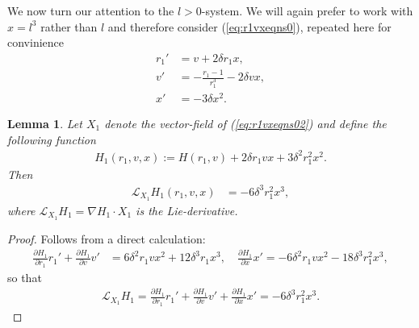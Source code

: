 \documentclass[reqno,12pt]{amsart}
\newcommand{\eqlab}[1]{\label{eq:#1}}
\renewcommand{\eqref}[1]{(\ref{eq:#1})}
\newcommand{\lemmalab}[1]{\label{lemma:#1}}
\newtheorem{lemma}[theorem]{Lemma}
\numberwithin{equation}{section}
\begin{document}
We now turn our attention to the $l>0$-system. We will again prefer to work with $x=l^3$ rather than $l$ and therefore consider \eqref{r1vxeqns0}, repeated here for convinience
\begin{equation}\eqlab{r1vxeqns02}
\begin{aligned}
 r_1' &=v+2\delta r_1 x,\\
 v'  &= -\frac{r_1-1}{r_1^3}-2\delta vx,\\
 x' &=-3 \delta x^2.
\end{aligned}
\end{equation}
\begin{lemma}\lemmalab{tildeH}
Let $X_1$ denote the vector-field of \eqref{r1vxeqns02}
and define the following function
\begin{align*}
 H_1(r_1,v,x):=H(r_1,v) +2 \delta r_1 v x +3 \delta^2 r_{1}^2 x^2.
\end{align*}
Then 
\begin{align}
 \mathcal L_{X_1} H_1(r_1,v,x) &=-6\delta^3 r_1^2 x^3,\eqlab{H1dot}
\end{align}
where $\mathcal L_{X_1} H_1=\nabla H_1 \cdot X_1$ is the Lie-derivative. 
\end{lemma}
\begin{proof}
Follows from a direct calculation:
 \begin{align*}
\frac{\partial H_1}{\partial r_1}r_1'+\frac{\partial H_1}{\partial v}v'&= 6 \delta^2 r_1 v x^2 + 12 \delta^3 r_1 x^3,\quad
\frac{\partial H_1}{\partial x}x' = -6 \delta^2 r_1 v x^2 - 18 \delta^3 r_{1}^2 x^3,
 \end{align*}
so that 
\begin{align*}
 \mathcal L_{X_1} H_1 = \frac{\partial H_1}{\partial r_1}r_1'+\frac{\partial H_1}{\partial v}v'+\frac{\partial H_1}{\partial x}x' =-6\delta^3 r_1^2 x^3.
\end{align*}

\end{proof}
\end{document}
